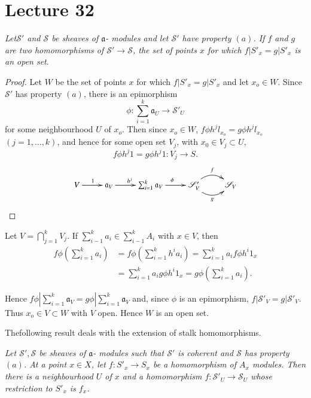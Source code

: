 \chapter{Lecture 32}\label{chap32:lec32}

\textit{Let\pageoriginale $\mathscr{S'}$ and $\mathscr{S}$ be sheaves of
  $\mathfrak{a}$- modules and let $\mathscr{S'}$ have property
$(a)$. If $f$ and $g$ are two homomorphisms of  $\mathscr{S'}
\rightarrow \mathscr{S}$, the set of points $x$ for which $f
| S'_x = g| S'_x$ is an open set}. 

\begin{proof}
Let $W$ be the set of points $x$ for which $f | S'_x = g| S'_x$ and
let $x_o \in W$. Since $\mathscr{S'}$ has property $(a)$, there is an
epimorphism 
$$
\phi : \sum^k_{i=1} \mathfrak{a}_U \rightarrow \mathscr{S'}_U 
$$
for some neighbourhood $U$ of $x_o$. Then since $x_o \in W$, $f \phi h^j
l_{x_o} = g \phi h^j l_{x_o}$ $(j = 1, \ldots , k)$, and hence for some
open set $V_j$, with $x_0 \in V_j \subset U$, 
$$
f \phi h^j 1 = g \phi h^j 1 : V_j \rightarrow S. 
$$
\[
\xymatrix{
V\ar[r]^1 & \mathfrak{a}_V \ar[r]^{h^j} & \sum^k_{i=1} \mathfrak{a}_V
\ar[r]^{\phi} & \mathscr{S}'_V \ar@/_1pc/[r]_g \ar@/^1pc/[r]^f&
\mathscr{S}_V 
}
\]
\end{proof}

Let $V = \bigcap^k_{j=1} V_j$. If $\sum^k_{i-1} a_i \in \sum^k_{i-1}
A_i$ with $x \in V$,  
then
\begin{align*}
f \phi (\sum^k_{i=1} a_i) & = f \phi (\sum^k_{i=1} h^i a_i) =
\sum^k_{i=1} a_i f \phi h^i 1_x \\ 
& = \sum^k_{i=1} a_i g \phi h^i 1_x = g \phi (\sum^k_{i=1} a_i). 
\end{align*}

Hence $f \phi |\sum^k_{i=1} \mathfrak{a}_V = g \phi | \sum^k_{i=1}
\mathfrak{a}_V$ and, 
since $\phi$ is an epimorphism, $f |\mathscr{S'}_V = g |
\mathscr{S'}_V$. Thus $x_o \in V \subset W$ with $V$ open. Hence $W$
is an open set. 

The\pageoriginale following result deals with the extension of stalk homomorphisms. 

\textit{Let $\mathscr{S'}, \mathscr{S}$ be sheaves of $\mathfrak{a}$-
modules such that $\mathscr{S'}$ is coherent and
$\mathscr{S}$ has property $(a)$. At a point $x \in
X$, let $f  : S'_x \rightarrow S_x$ be a homomorphism of $A_x$
modules. Then there is a neighbourhood $U$ of $x$ and
  a homomorphism  $f : \mathscr{S'}_U \rightarrow \mathscr{S}_U$
whose restriction to  $S'_x$ is $f_x$.} 


